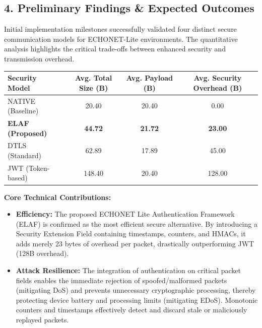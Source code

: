 \documentclass[11pt,a4paper]{article}
\begin{document}
\begin{sectioncard}

\section*{4. Preliminary Findings \& Expected Outcomes}
Initial implementation milestones successfully validated four distinct secure communication models for ECHONET-Lite environments. The quantitative analysis highlights the critical trade-offs between enhanced security and transmission overhead.

\vspace{10pt}
\noindent
\begin{tabularx}{\textwidth}{|X|c|c|c|}
    \hline
    \rowcolor{tablehead}
    \textbf{Security Model} & \textbf{Avg. Total Size (B)} & \textbf{Avg. Payload (B)} & \textbf{Avg. Security Overhead (B)} \\
    \hline
    NATIVE (Baseline) & 20.40 & 20.40 & 0.00 \\
    \textbf{ELAF (Proposed)} & \textbf{44.72} & \textbf{21.72} & \textbf{23.00} \\
    DTLS (Standard) & 62.89 & 17.89 & 45.00 \\
    JWT (Token-based) & 148.40 & 20.40 & 128.00 \\
    \hline
\end{tabularx}
\vspace{15pt}

\begin{highlightbox}
    \textbf{Core Technical Contributions:}
    \begin{itemize}
        \item \textbf{Efficiency:} The proposed ECHONET Lite Authentication Framework (ELAF) is confirmed as the most efficient secure alternative. By introducing a Security Extension Field containing timestamps, counters, and HMACs, it adds merely 23 bytes of overhead per packet, drastically outperforming JWT (128B overhead).
        \item \textbf{Attack Resilience:} The integration of authentication on critical packet fields enables the immediate rejection of spoofed/malformed packets (mitigating DoS) and prevents unnecessary cryptographic processing, thereby protecting device battery and processing limits (mitigating EDoS). Monotonic counters and timestamps effectively detect and discard stale or maliciously replayed packets.
    \end{itemize}
\end{highlightbox}
\end{sectioncard}
\end{document}
